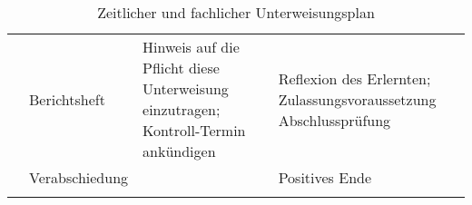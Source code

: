 \begin{longtable}[c]{@{}lp{3.5cm}p{4.5cm}p{4.0cm}@{}}
	& Berichtsheft                                 & Hinweis auf die Pflicht diese Unterweisung einzutragen; Kontroll-Termin ankündigen                                                                        & Reflexion des Erlernten; Zulassungsvoraussetzung Abschlussprüfung \\* \cmidrule(l){2-4} 
	& Verabschiedung                               &                                                                                                                                                           & Positives Ende                                                    \\* \bottomrule
	\caption{Zeitlicher und fachlicher Unterweisungsplan}
	\label{tab:Unterweisungsplan}
\end{longtable}